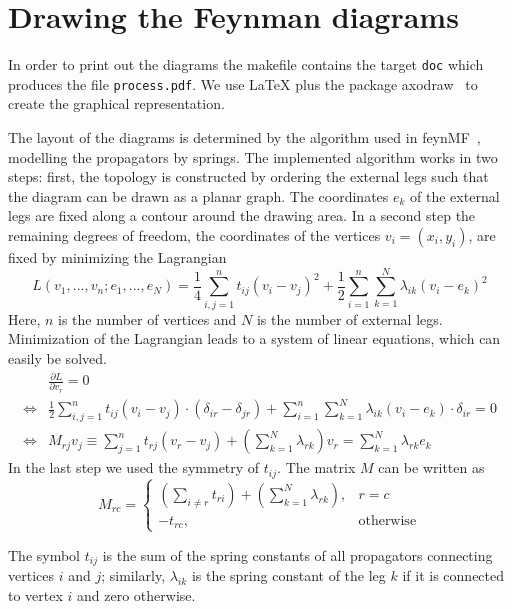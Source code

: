 \section{Drawing the Feynman diagrams}
In order to print out the diagrams the makefile contains the target
\texttt{doc} which produces the file \texttt{process.pdf}.
We use \LaTeX{} plus the package \textsf{axodraw}~\cite{Vermaseren:1994je}
to create the graphical representation.

The layout of the diagrams is determined by the algorithm used in
\textsf{feynMF}~\cite{Ohl:1995kr}, modelling the propagators by springs.
The implemented algorithm works in two steps: first, the topology is
constructed by ordering the external legs such that the diagram can
be drawn as a planar graph. The coordinates $e_k$
of the external legs are
fixed along a contour around the drawing area.
In a second step the remaining degrees of freedom, the coordinates
of the vertices $v_i=(x_i, y_i)$, are fixed by minimizing the Lagrangian
\begin{equation}
L(v_1, \ldots, v_n; e_1, \ldots, e_N) =
 \frac14\sum_{i,j=1}^n t_{ij}\left(v_i-v_j\right)^2
+\frac12\sum_{i=1}^n\sum_{k=1}^N\lambda_{ik}\left(v_i-e_k\right)^2
\end{equation}
Here, $n$ is the number of vertices and $N$ is the number of external
legs.
Minimization of the Lagrangian leads to a system of linear equations, which
can easily be solved.
\begin{align*}
&\frac{\partial L}{\partial v_r}=0\\
\Leftrightarrow&
 \frac12\sum_{i,j=1}^n t_{ij}\left(v_i-v_j\right)
     \cdot\left(\delta_{ir}-\delta_{jr}\right)
+\sum_{i=1}^n\sum_{k=1}^N\lambda_{ik}\left(v_i-e_k\right)
     \cdot\delta_{ir}=0\\
\Leftrightarrow&
M_{rj}v_j\equiv
 \sum_{j=1}^n t_{rj}\left(v_r-v_j\right)
+\left(\sum_{k=1}^N\lambda_{rk}\right)v_r
=\sum_{k=1}^N\lambda_{rk}e_k
\end{align*}
In the last step we used the symmetry of $t_{ij}$.
The matrix $M$ can be written as
\begin{equation}
M_{rc}=\left\{\begin{array}{ll}
\left(\sum_{i\neq r}t_{ri}\right)+
\left(\sum_{k=1}^N\lambda_{rk}\right),&
r=c\\
-t_{rc},&\text{otherwise}
\end{array}\right.
\end{equation}

The symbol $t_{ij}$ is the sum of the spring constants of all
propagators connecting vertices $i$ and $j$; similarly, $\lambda_{ik}$
is the spring constant of the leg $k$ if it is connected to vertex $i$
and zero otherwise.

